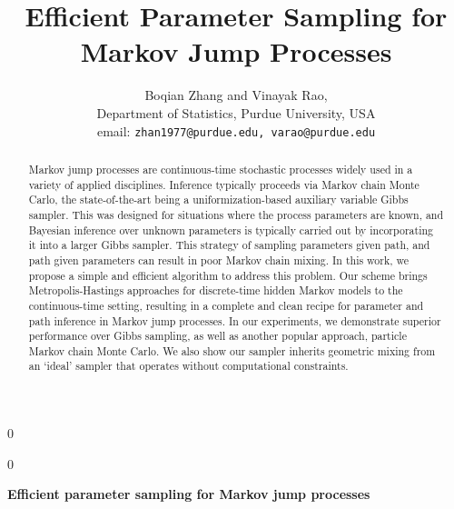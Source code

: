 \documentclass[12pt]{article}
\newcommand{\blind}{0}
\begin{document}
%

\def\spacingset#1{\renewcommand{\baselinestretch}%
{#1}\small\normalsize} \spacingset{1}



\blind
{
  \title{\bf Efficient Parameter Sampling for Markov Jump Processes}
  \author{Boqian Zhang and Vinayak Rao, \\
          Department of Statistics, Purdue University, USA \\
          email: \texttt{zhan1977@purdue.edu, varao@purdue.edu}
  }
  \maketitle
} \fi

\blind
{
  \bigskip
  \bigskip
  \bigskip
  \begin{center}
    {\LARGE\bf Efficient parameter sampling for Markov jump processes}
\end{center}
  \medskip
} \fi

\bigskip
\begin{abstract}
Markov jump processes  are continuous-time stochastic processes 
widely used in a variety of applied disciplines. Inference typically
proceeds via Markov chain Monte Carlo, the state-of-the-art being a 
uniformization-based auxiliary
variable Gibbs sampler. This was
designed for situations where the process parameters are known, and Bayesian
inference over unknown parameters is typically carried out by incorporating
it into a larger Gibbs sampler.
This strategy of sampling parameters given path, and
path given parameters can result in poor Markov chain mixing. In this
work, we propose a simple and efficient algorithm to address this
problem. Our scheme brings Metropolis-Hastings approaches
for discrete-time hidden Markov models to the continuous-time
setting, %
resulting in %
 a complete and clean recipe for
parameter and path inference in Markov jump processes. In our experiments, we
demonstrate superior performance over Gibbs sampling, as well as
another popular approach, particle Markov chain Monte Carlo.
We also show our sampler inherits geometric mixing from an `ideal' 
sampler that operates without computational constraints.
\end{abstract}
\end{document}
